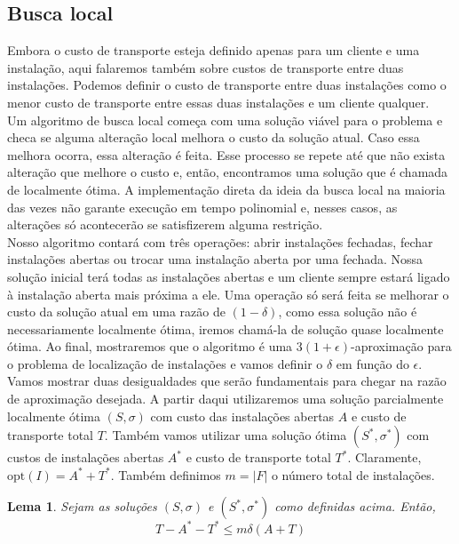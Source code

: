 \documentclass[12pt]{article}
\newcommand{\opt}{\ensuremath{\mathrm{opt}}}
\newtheorem{lemma}[theorem]{Lema}
\begin{document}
\newpage

\subsection{Busca local}
Embora o custo de transporte esteja definido apenas para um cliente e uma instalação, aqui falaremos também sobre custos de transporte entre duas instalações. Podemos definir o custo de transporte entre duas instalações como o menor custo de transporte entre essas duas instalações e um cliente qualquer. \\
Um algoritmo de busca local começa com uma solução viável para o problema e checa se alguma alteração local melhora o custo da solução atual. Caso essa melhora ocorra, essa alteração é feita. Esse processo se repete até que não exista alteração que melhore o custo e, então, encontramos uma solução que é chamada de localmente ótima. A implementação direta da ideia da busca local na maioria das vezes não garante execução em tempo polinomial e, nesses casos, as alterações só acontecerão se satisfizerem alguma restrição. \\
Nosso algoritmo contará com três operações: abrir instalações fechadas, fechar instalações abertas ou trocar uma instalação aberta por uma fechada. Nossa solução inicial terá todas as instalações abertas e um cliente sempre estará ligado à instalação aberta mais próxima a ele. Uma operação só será feita se melhorar o custo da solução atual em uma razão de $(1-\delta)$, como essa solução não é necessariamente localmente ótima, iremos chamá-la de solução quase localmente ótima. Ao final, mostraremos que o algoritmo é uma $3(1 + \epsilon)$-aproximação para o problema de localização de instalações e vamos definir o $\delta$ em função do $\epsilon$. \\
Vamos mostrar duas desigualdades que serão fundamentais para chegar na razão de aproximação desejada. A partir daqui utilizaremos uma solução parcialmente localmente ótima $(S,\sigma)$ com custo das instalações abertas $A$ e custo de transporte total $T$. Também vamos utilizar uma solução ótima $(S^*,\sigma^*)$ com custos de instalações abertas $A^*$ e custo de transporte total $T^*$. Claramente, $\opt(I) = A^* + T^*$. Também definimos $m = |F|$ o número total de instalações.
\newpage
\begin{lemma}
    \label{lema:3.7}
    Sejam as soluções $(S,\sigma)$ e $(S^*,\sigma^*)$ como definidas acima. Então,
    \[ T - A^* - T^* \leq m \delta (A+T)\]
\end{lemma}
\end{document}
